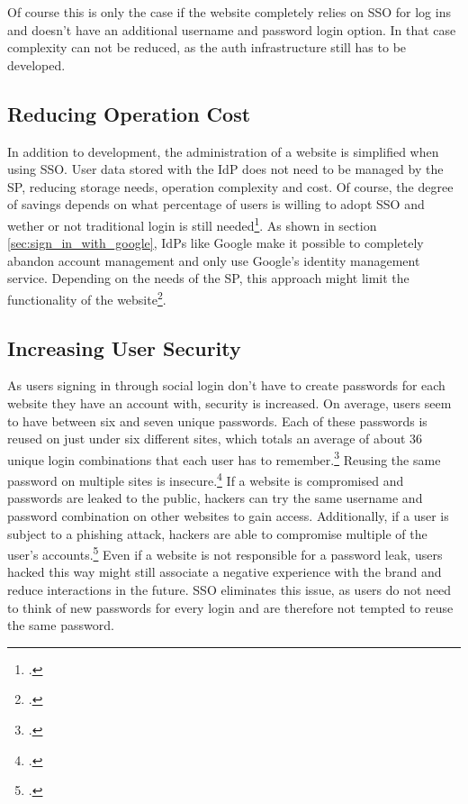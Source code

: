 Of course this is only the case if the website completely relies on \ac{SSO} for log ins and doesn't have an additional username and password login option.
In that case complexity can not be reduced, as the auth infrastructure still has to be developed.

\subsection{Reducing Operation Cost}

In addition to development, the administration of a website is simplified when using \ac{SSO}.
User data stored with the \ac{IdP} does not need to be managed by the \ac{SP}, reducing storage needs,
operation complexity and cost. Of course, the degree of savings depends on what percentage of users is willing
to adopt \ac{SSO} and wether or not traditional login is still needed\footcite[Cp.][p. 22]{Bazaz2016}.
As shown in section \ref{sec:sign_in_with_google}, \acp{IdP} like Google make it possible to completely
abandon account management and only use Google's identity management service.
Depending on the needs of the \ac{SP}, this approach might limit the functionality of the website\footcite[Cp.][p. 22]{Bazaz2016}.

\subsection{Increasing User Security}

As users signing in through social login don't have to create passwords for each website they have an account with, security is increased.
On average, users seem to have between six and seven unique passwords. Each of these passwords is reused on just
under six different sites, which totals an average of about 36 unique login combinations that each user has to remember.\footcite[Cp.][p. 4]{Florencio2006}
Reusing the same password on multiple sites is insecure.\footcite[Cp.][p. 249]{Pashalidis2003}
If a website is compromised and passwords are leaked to the public, hackers can try the same username and password
combination on other websites to gain access. Additionally, if a user is subject to a phishing attack,
hackers are able to compromise multiple of the user's accounts.\footcite[Cp.][]{McDade2022}
Even if a website is not responsible for a password leak, users hacked this way might still associate a negative
experience with the brand and reduce interactions in the future.
\ac{SSO} eliminates this issue, as users do not need to think of new passwords for every login and are therefore
not tempted to reuse the same password.

